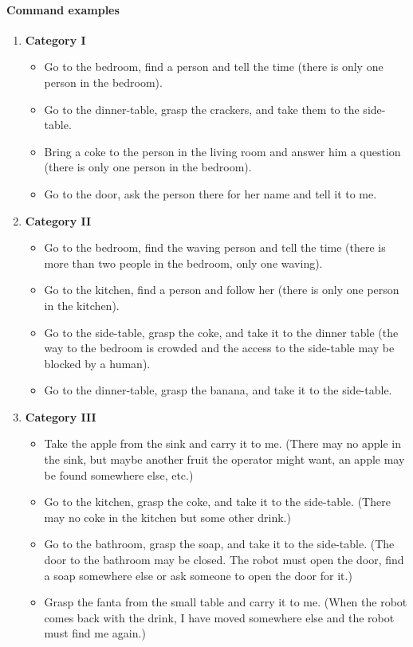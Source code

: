 \paragraph{Command examples}
\begin{enumerate}
	\item \textbf{Category I}
	\begin{itemize}
		\item Go to the bedroom, find a person and tell the time (there is only one person in the bedroom).
		\item Go to the dinner-table, grasp the crackers, and take them to the side-table.
		\item Bring a coke to the person in the living room and answer him a question (there is only one person in the bedroom).
		\item Go to the door, ask the person there for her name and tell it to me.
	\end{itemize}
	\item \textbf{Category II}
	\begin{itemize}
		\item Go to the bedroom, find the waving person and tell the time (there is more than two people in the bedroom, only one waving).
		\item Go to the kitchen, find a person and follow her (there is only one person in the kitchen).
		\item Go to the side-table, grasp the coke, and take it to the dinner table (the way to the bedroom is crowded and the access to the side-table may be blocked by a human).
		\item Go to the dinner-table, grasp the banana, and take it to the side-table.
	\end{itemize}
	\item \textbf{Category III}
	\begin{itemize}
		\item Take the apple from the sink and carry it to me. 
		  (There may no apple in the sink, but maybe another fruit the operator might want, an apple may be found somewhere else, etc.)
		\item Go to the kitchen, grasp the coke, and take it to the side-table.
		  (There may no coke in the kitchen but some other drink.)		
		  \item Go to the bathroom, grasp the soap, and take it to the side-table.
		  (The door to the bathroom may be closed. The robot must open the door, find a soap somewhere else or ask someone to open the door for it.)
		\item Grasp the fanta from the small table and carry it to me.
		  (When the robot comes back with the drink, I have moved somewhere else and the robot must find me again.)
	\end{itemize} 
\end{enumerate}

